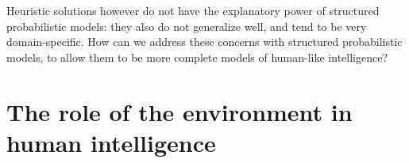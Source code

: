 Heuristic solutions however do not have the explanatory power of structured probabilistic models: they also do not generalize well, and tend to be very domain-specific. How can we address these concerns with structured probabilistic models, to allow them to be more complete models of human-like intelligence?




\section*{The role of the environment in human intelligence}

